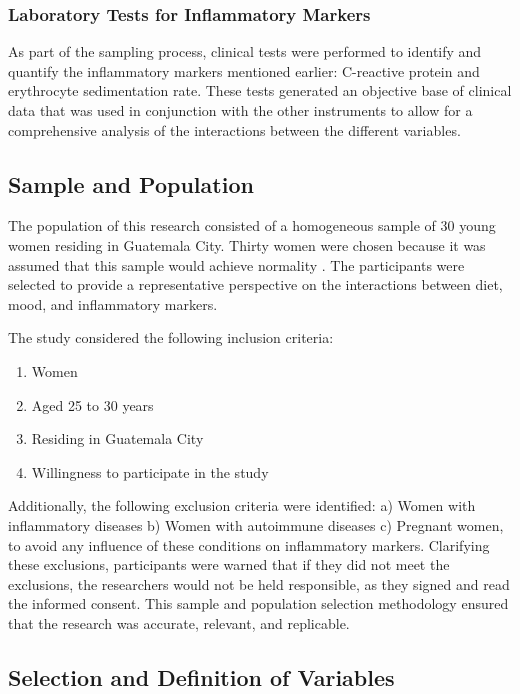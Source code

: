 \documentclass[jou]{apa7}
\begin{document}
\subsubsection{Laboratory Tests for Inflammatory Markers}
As part of the sampling process, clinical tests were performed to identify and quantify the inflammatory markers mentioned earlier: C-reactive protein and erythrocyte sedimentation rate. These tests generated an objective base of clinical data that was used in conjunction with the other instruments to allow for a comprehensive analysis of the interactions between the different variables.

\subsection{Sample and Population}\label{muestra-y-poblaciuxf3n}

The population of this research consisted of a homogeneous sample of 30 young women residing in Guatemala City. Thirty women were chosen because it was assumed that this sample would achieve normality \parencite{Hernandez2018}. The participants were selected to provide a representative perspective on the interactions between diet, mood, and inflammatory markers.

The study considered the following inclusion criteria:
\begin{enumerate}
	\item Women
	\item Aged 25 to 30 years
	\item Residing in Guatemala City
	\item Willingness to participate in the study
\end{enumerate}

Additionally, the following exclusion criteria were identified: a) Women with inflammatory diseases b) Women with autoimmune diseases c) Pregnant women, to avoid any influence of these conditions on inflammatory markers. Clarifying these exclusions, participants were warned that if they did not meet the exclusions, the researchers would not be held responsible, as they signed and read the informed consent. This sample and population selection methodology ensured that the research was accurate, relevant, and replicable.

\subsection{Selection and Definition of Variables}\label{selecciuxf3n-y-definiciuxf3n-de-variables}
\end{document}
